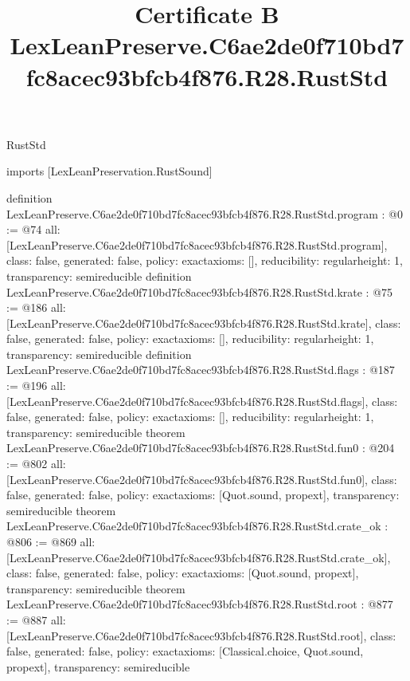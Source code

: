 \begin{lexlean}{RustStd}
\title{Certificate B LexLeanPreserve.C6ae2de0f710bd7fc8acec93bfcb4f876.R28.RustStd}
\begin{coremodule}
imports [LexLeanPreservation.RustSound]

definition LexLeanPreserve.C6ae2de0f710bd7fc8acec93bfcb4f876.R28.RustStd.program : @0 := @74 {
  all: [LexLeanPreserve.C6ae2de0f710bd7fc8acec93bfcb4f876.R28.RustStd.program],
  class: false,
  generated: false,
  policy: exact{axioms: []},
  reducibility: regular{height: 1},
  transparency: semireducible
}
definition LexLeanPreserve.C6ae2de0f710bd7fc8acec93bfcb4f876.R28.RustStd.krate : @75 := @186 {
  all: [LexLeanPreserve.C6ae2de0f710bd7fc8acec93bfcb4f876.R28.RustStd.krate],
  class: false,
  generated: false,
  policy: exact{axioms: []},
  reducibility: regular{height: 1},
  transparency: semireducible
}
definition LexLeanPreserve.C6ae2de0f710bd7fc8acec93bfcb4f876.R28.RustStd.flags : @187 := @196 {
  all: [LexLeanPreserve.C6ae2de0f710bd7fc8acec93bfcb4f876.R28.RustStd.flags],
  class: false,
  generated: false,
  policy: exact{axioms: []},
  reducibility: regular{height: 1},
  transparency: semireducible
}
theorem LexLeanPreserve.C6ae2de0f710bd7fc8acec93bfcb4f876.R28.RustStd.fun0 : @204 := @802 {
  all: [LexLeanPreserve.C6ae2de0f710bd7fc8acec93bfcb4f876.R28.RustStd.fun0],
  class: false,
  generated: false,
  policy: exact{axioms: [Quot.sound, propext]},
  transparency: semireducible
}
theorem LexLeanPreserve.C6ae2de0f710bd7fc8acec93bfcb4f876.R28.RustStd.crate_ok : @806 := @869 {
  all: [LexLeanPreserve.C6ae2de0f710bd7fc8acec93bfcb4f876.R28.RustStd.crate_ok],
  class: false,
  generated: false,
  policy: exact{axioms: [Quot.sound, propext]},
  transparency: semireducible
}
theorem LexLeanPreserve.C6ae2de0f710bd7fc8acec93bfcb4f876.R28.RustStd.root : @877 := @887 {
  all: [LexLeanPreserve.C6ae2de0f710bd7fc8acec93bfcb4f876.R28.RustStd.root],
  class: false,
  generated: false,
  policy: exact{axioms: [Classical.choice, Quot.sound, propext]},
  transparency: semireducible
}


\end{coremodule}
\end{lexlean}
